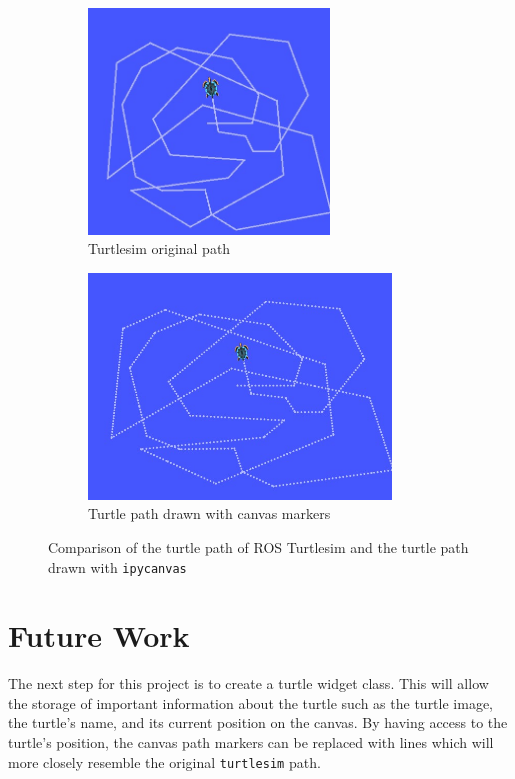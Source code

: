         \begin{figure}[hb]
            \centering
            \begin{subfigure}{.45\textwidth}
                \centering
                \includegraphics[height=6cm]{Images/01_realPath.jpg}
                \caption{Turtlesim original path}
                \label{fig:realPath}
            \end{subfigure}%
            \begin{subfigure}{.55\textwidth}
                \centering
                \includegraphics[height=6cm]{Images/01_path.jpg}
                \caption{Turtle path drawn with canvas markers}
                \label{fig:dottedPath}
                \end{subfigure}
                \caption{Comparison of the turtle path of ROS Turtlesim and the turtle path drawn with \texttt{ipycanvas}}
            \label{fig:comparePath}
        \end{figure}
    
\section{Future Work}

    The next step for this project is to create a turtle widget class. This will allow the storage of important information about the turtle such as the turtle image, the turtle's name, and its current position on the canvas. By having access to the turtle's position, the canvas path markers can be replaced with lines which will more closely resemble the original \texttt{turtlesim} path.




